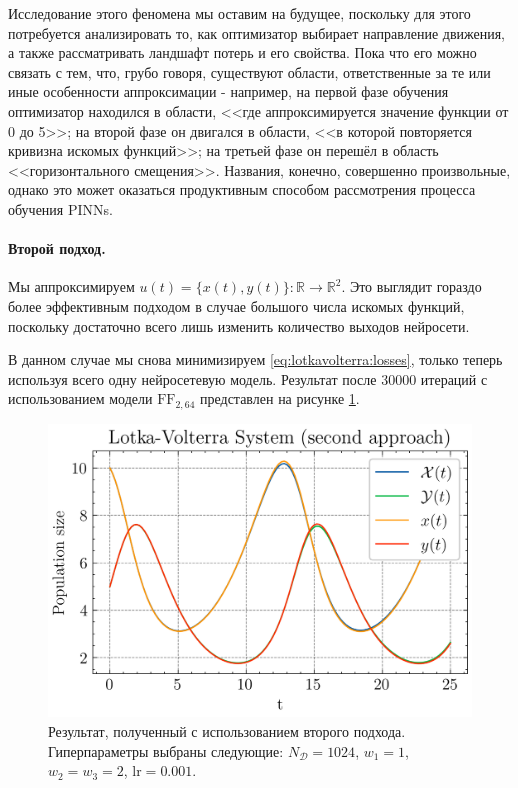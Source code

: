 \documentclass[a4paper, 12pt]{article}
\begin{document}
Исследование этого феномена мы оставим на будущее, поскольку для этого потребуется анализировать то, как оптимизатор выбирает направление движения, а также рассматривать ландшафт потерь и его свойства. Пока что его можно связать с тем, что, грубо говоря, существуют области, ответственные за те или иные особенности аппроксимации - например, на первой фазе обучения оптимизатор находился в области, <<где аппроксимируется значение функции от 0 до 5>>; на второй фазе он двигался в области, <<в которой повторяется кривизна искомых функций>>; на третьей фазе он перешёл в область <<горизонтального смещения>>. Названия, конечно, совершенно произвольные, однако это может оказаться продуктивным способом рассмотрения процесса обучения PINNs.

\paragraph{Второй подход.} Мы аппроксимируем $u(t) = \{x(t), y(t)\} : \mathbb{R} \to \mathbb{R}^2$. Это выглядит гораздо более эффективным подходом в случае большого числа искомых функций, поскольку достаточно всего лишь изменить количество выходов нейросети.

В данном случае мы снова минимизируем \ref{eq:lotkavolterra:losses}, только теперь используя всего одну нейросетевую модель. Результат после 30000 итераций с использованием модели $\mathrm{FF}_{2, 64}$ представлен на рисунке \ref{fig:lotkavolterra:second:solution}.

\begin{figure}
    \centering
    \includegraphics{../Differential Equation Solution/images/lotkavolterra/second approach/Lotka-Volterra System (second approach).png}
    \caption{Результат, полученный с использованием второго подхода. Гиперпараметры выбраны следующие: $N_\mathcal{D} = 1024$, $w_1 = 1$, $w_2 = w_3 = 2$, $\mathrm{lr} = 0.001$.}
    \label{fig:lotkavolterra:second:solution}
\end{figure}
\end{document}
